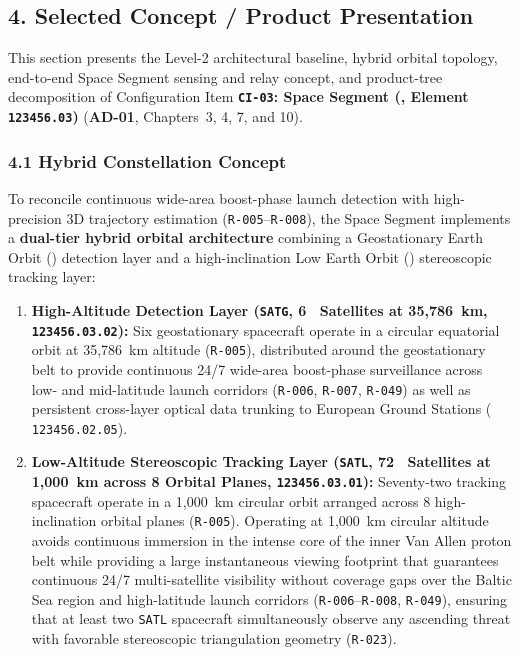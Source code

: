 \subsection{4. Selected Concept / Product Presentation}

This section presents the Level-2 architectural baseline, hybrid orbital topology, end-to-end Space Segment sensing and relay concept, and product-tree decomposition of Configuration Item \textbf{\texttt{CI-03}: Space Segment (,  Element \texttt{123456.03})} (\textbf{AD-01}, Chapters~3, 4, 7, and 10).

\subsubsection{4.1 Hybrid Constellation Concept}

To reconcile continuous wide-area boost-phase launch detection with high-precision 3D trajectory estimation (\texttt{R-005}--\texttt{R-008}), the  Space Segment implements a \textbf{dual-tier hybrid orbital architecture} combining a Geostationary Earth Orbit () detection layer and a high-inclination Low Earth Orbit () stereoscopic tracking layer:
\begin{enumerate}
    \item \textbf{High-Altitude Detection Layer (\texttt{SATG}, 6~ Satellites at 35,786~km,  \texttt{123456.03.02}):} Six geostationary spacecraft operate in a circular equatorial orbit at 35,786~km altitude (\texttt{R-005}), distributed around the geostationary belt to provide continuous 24/7 wide-area boost-phase surveillance across low- and mid-latitude launch corridors (\texttt{R-006}, \texttt{R-007}, \texttt{R-049}) as well as persistent cross-layer optical data trunking to European Ground Stations ( \texttt{123456.02.05}).
    \item \textbf{Low-Altitude Stereoscopic Tracking Layer (\texttt{SATL}, 72~ Satellites at 1,000~km across 8 Orbital Planes,  \texttt{123456.03.01}):} Seventy-two tracking spacecraft operate in a 1,000~km circular orbit arranged across 8 high-inclination orbital planes (\texttt{R-005}). Operating at 1,000~km circular altitude avoids continuous immersion in the intense core of the inner Van Allen proton belt while providing a large instantaneous viewing footprint that guarantees continuous 24/7 multi-satellite visibility without coverage gaps over the Baltic Sea region and high-latitude launch corridors (\texttt{R-006}--\texttt{R-008}, \texttt{R-049}), ensuring that at least two \texttt{SATL} spacecraft simultaneously observe any ascending threat with favorable stereoscopic triangulation geometry (\texttt{R-023}).
\end{enumerate}

